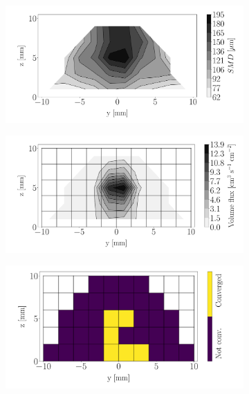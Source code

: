 

\begin{figure}[h!]
\centering
\begin{subfigure}[b]{0.3\textwidth}
	\centering
   \includegraphics[scale=\scaleSLIJICF]{./part2_developments/figures_ch5_resolved_JICF/injectors_SLI/uG100_dx20_x15_SMD_map}
\end{subfigure}
   \hspace{0.17in}
\begin{subfigure}[b]{0.3\textwidth}
	\centering
   \includegraphics[scale=\scaleSLIJICF]{./part2_developments/figures_ch5_resolved_JICF/injectors_SLI/uG100_dx20_x15_volume_flux_map}
\end{subfigure}
   \hspace{0.17in}
\begin{subfigure}[b]{0.3\textwidth}
	\centering
   \includegraphics[scale=\scaleSLIJICF]{./part2_developments/figures_ch5_resolved_JICF/injectors_SLI/uG100_dx20_x15_convergence_map}
\end{subfigure}


\end{figure}
